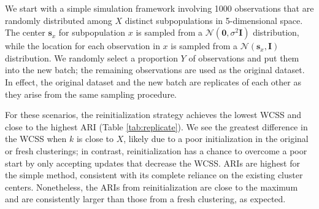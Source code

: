 \documentclass{article}
\begin{document}
We start with a simple simulation framework involving 1000 observations that are randomly distributed among $X$ distinct subpopulations in 5-dimensional space.
The center $\mathbf{s}_x$ for subpopulation $x$ is sampled from a $\mathcal{N}(\mathbf{0}, \sigma^2 \mathbf{I})$ distribution,
while the location for each observation in $x$ is sampled from a $\mathcal{N}(\mathbf{s}_x, \mathbf{I})$ distribution.
We randomly select a proportion $Y$ of observations and put them into the new batch; the remaining observations are used as the original dataset.
In effect, the original dataset and the new batch are replicates of each other as they arise from the same sampling procedure.

For these scenarios, the reinitialization strategy achieves the lowest WCSS and close to the highest ARI (Table \ref{tab:replicate}).
We see the greatest difference in the WCSS when $k$ is close to $X$, likely due to a poor initialization in the original or fresh clusterings;
in contrast, reinitialization has a chance to overcome a poor start by only accepting updates that decrease the WCSS.
ARIs are highest for the simple method, consistent with its complete reliance on the existing cluster centers.
Nonetheless, the ARIs from reinitialization are close to the maximum and are consistently larger than those from a fresh clustering, as expected.
\end{document}

